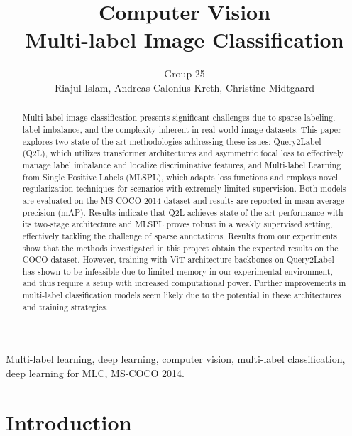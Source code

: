 \documentclass[lettersize,journal]{IEEEtran}
\begin{document}
\title{Computer Vision\\ \vspace{.5em} 
\Large Multi-label Image Classification}
\author{Group 25 \\ \vspace{.2em} Riajul Islam, Andreas Calonius Kreth, Christine Midtgaard}

\maketitle

\begin{abstract}
Multi-label image classification presents significant challenges due to sparse labeling, label imbalance, and the complexity inherent in real-world image datasets. This paper explores two state-of-the-art methodologies addressing these issues: Query2Label (Q2L), which utilizes transformer architectures and asymmetric focal loss to effectively manage label imbalance and localize discriminative features, and Multi-label Learning from Single Positive Labels (MLSPL), which adapts loss functions and employs novel regularization techniques for scenarios with extremely limited supervision. Both models are evaluated on the MS-COCO 2014 dataset and results are reported in mean average precision (mAP). Results indicate that Q2L achieves state of the art performance with its two-stage architecture and MLSPL proves robust in a weakly supervised setting, effectively tackling the challenge of sparse annotations. Results from our experiments show that the methods investigated in this project obtain the expected results on the COCO dataset. However, training with ViT architecture backbones on Query2Label has shown to be infeasible due to limited memory in our experimental environment, and thus require a setup with increased computational power. Further improvements in multi-label classification models seem likely due to the potential in these architectures and training strategies.
\end{abstract}

\begin{IEEEkeywords}
Multi-label learning, deep learning, computer vision, multi-label
classification, deep learning for MLC, MS-COCO 2014. 

\end{IEEEkeywords}


\section{Introduction}
\end{document}
